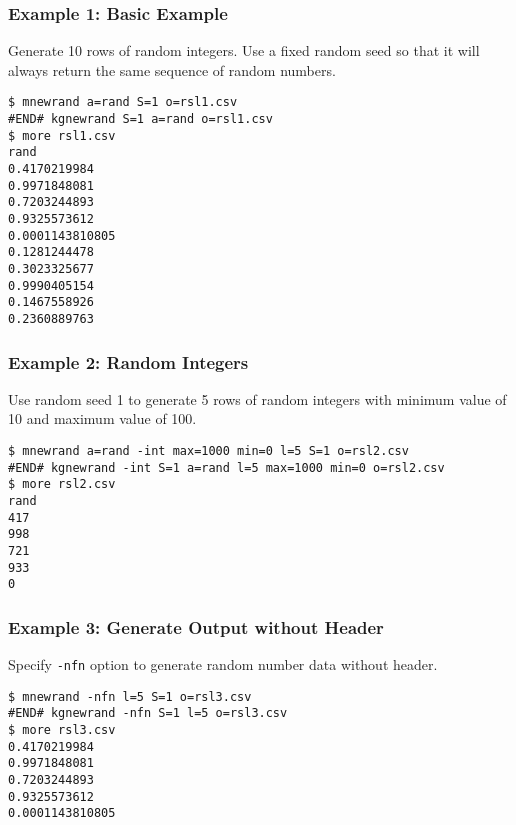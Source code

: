 \subsubsection*{Example 1: Basic Example}

Generate 10 rows of random integers. Use a fixed random seed so that it will always return the same sequence of random numbers.


\begin{Verbatim}[baselinestretch=0.7,frame=single]
$ mnewrand a=rand S=1 o=rsl1.csv
#END# kgnewrand S=1 a=rand o=rsl1.csv
$ more rsl1.csv
rand
0.4170219984
0.9971848081
0.7203244893
0.9325573612
0.0001143810805
0.1281244478
0.3023325677
0.9990405154
0.1467558926
0.2360889763
\end{Verbatim}
\subsubsection*{Example 2: Random Integers}

Use random seed 1 to generate 5 rows of random integers with minimum value of 10 and maximum value of 100.


\begin{Verbatim}[baselinestretch=0.7,frame=single]
$ mnewrand a=rand -int max=1000 min=0 l=5 S=1 o=rsl2.csv
#END# kgnewrand -int S=1 a=rand l=5 max=1000 min=0 o=rsl2.csv
$ more rsl2.csv
rand
417
998
721
933
0
\end{Verbatim}
\subsubsection*{Example 3: Generate Output without Header}

Specify \verb|-nfn| option to generate random number data without header.


\begin{Verbatim}[baselinestretch=0.7,frame=single]
$ mnewrand -nfn l=5 S=1 o=rsl3.csv
#END# kgnewrand -nfn S=1 l=5 o=rsl3.csv
$ more rsl3.csv
0.4170219984
0.9971848081
0.7203244893
0.9325573612
0.0001143810805
\end{Verbatim}
